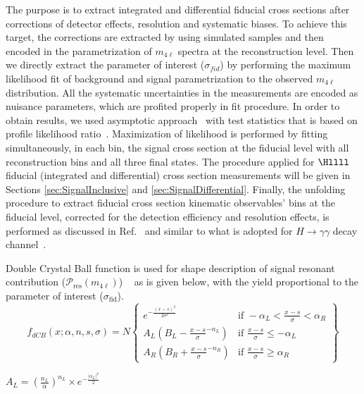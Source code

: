  The purpose is to extract integrated and differential fiducial cross sections after corrections of detector effects, resolution and systematic biases. To
achieve
this target, the corrections are extracted by using simulated samples and then encoded in the parametrization of $m_{4\ell}$ spectra at the 
reconstruction level. Then we directly extract the parameter of interest ($\sigma{}_{fid}$) by performing the maximum likelihood fit of background and 
signal
parametrization to the observed $m_{4\ell}$ distribution. 
All the systematic uncertainties in the measurements are encoded as nuisance parameters, which are profited properly in fit procedure. In order to obtain results, we used asymptotic approach~\cite{Cowan:2010js} with test statistics that is based on profile likelihood ratio~\cite{LHC-HCG}. Maximization of  likelihood is performed by fitting simultaneously, in each bin, the signal cross section at the fiducial level with all reconstruction bins and all three final states. 
The procedure applied for $\Hllll$ fiducial (integrated and differential) cross section measurements will be given in  Sections \ref{sec:SignalInclusive} and \ref{sec:SignalDifferential}. 
Finally, the unfolding procedure to extract fiducial cross section kinematic observables' bins at the fiducial level, corrected for the detection 
efficiency and resolution effects, is performed as discussed in Ref.~\cite{Prosper:2011zz} and similar to what is adopted for $H \rightarrow \gamma\gamma$ decay
channel~\cite{CMS:HIG-14-016}.
\par 
Double Crystal Ball function is used for shape description of signal resonant contribution ($\mathcal{P}_{\mathrm{res}}(m_{4\ell})$) ~\cite{Chatrchyan:2013mxa} as is given below, with the yield proportional to the
parameter of interest ($\sigma_{\mathrm{fid}}$). 
\begin{equation}\label{eq:dCBDef}
f_{dCB}(x;\alpha,n,s,\sigma) = N
\left \{
    \begin{array}{ll}
        e^{-\frac{(x-s)^{2}}{2\sigma^2}}  & \mbox{if } -\alpha_{L} < \frac{x-s}{\sigma} < \alpha_{R}  \\
        A_{L}(B_{L} - \frac{x-s}{\sigma}^{-n_{L}})   & \mbox{if } \frac{x-s}{\sigma} \leq -\alpha_{L} \\
        A_{R}(B_{R} + \frac{x-s}{\sigma}^{-n_{R}})   & \mbox{if } \frac{x-s}{\sigma} \geq \alpha_{R}
    \end{array}
\right \}
\end{equation}

\begin{center}
$A_{L} = (\frac{n_{L}}{\alpha})^{n_{L}} \times e^{-\frac{|\alpha_{L}|^{2}}{2}}$
\end{center}

